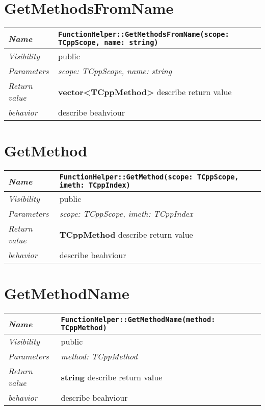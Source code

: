  \section{GetMethodsFromName}
\begin{longtable}{p{3cm} @{\hskip 1cm} p{12cm}}
 \hline
\textit{Name} & \texttt{FunctionHelper::GetMethodsFromName(scope: TCppScope, name: string)}\\
\hline
 \textit{Visibility} & public\\
\hline
\textit{Parameters} & \textit{scope: TCppScope, name: string}\\
\hline
\textit{Return value} & \textbf{ vector<TCppMethod>} describe return value\\
  \hline
 \textit{behavior} & describe beahviour \\
\hline
\end{longtable} \pagebreak
 \section{GetMethod}
\begin{longtable}{p{3cm} @{\hskip 1cm} p{12cm}}
 \hline
\textit{Name} & \texttt{FunctionHelper::GetMethod(scope: TCppScope, imeth: TCppIndex)}\\
\hline
 \textit{Visibility} & public\\
\hline
\textit{Parameters} & \textit{scope: TCppScope, imeth: TCppIndex}\\
\hline
\textit{Return value} & \textbf{ TCppMethod} describe return value\\
  \hline
 \textit{behavior} & describe beahviour \\
\hline
\end{longtable} \pagebreak
 \section{GetMethodName}
\begin{longtable}{p{3cm} @{\hskip 1cm} p{12cm}}
 \hline
\textit{Name} & \texttt{FunctionHelper::GetMethodName(method: TCppMethod)}\\
\hline
 \textit{Visibility} & public\\
\hline
\textit{Parameters} & \textit{method: TCppMethod}\\
\hline
\textit{Return value} & \textbf{ string} describe return value\\
  \hline
 \textit{behavior} & describe beahviour \\
\hline
\end{longtable} \pagebreak
